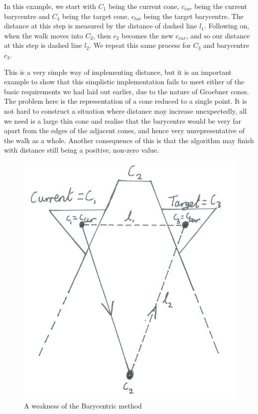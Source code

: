 \documentclass[12pt,a4paper]{report}
\begin{document}
In this example, we start with $C_{1}$ being the current cone, $c_{cur}$ being the current barycentre and $C_{4}$ being the target cone, $c_{tar}$ being the target barycentre. The distance at this step is measured by the distance of dashed line $l_{1}$. Following on, when the walk moves into $C_{2}$, then $c_{2}$ becomes the new $c_{cur}$, and so our distance at this step is dashed line $l_{2}$. We repeat this same process for $C_{3}$ and barycentre $c_{3}$.


This is a very simple way of implementing distance, but it is an important example to show that this simplistic implementation fails to meet either of the basic requirements we had laid out earlier, due to the nature of Groebner cones. The problem here is the representation of a cone reduced to a single point. It is not hard to construct a situation where distance may increase unexpectedly, all we need is a large thin cone and realise that the barycentre would be very far apart from the edges of the adjacent cones, and hence very unrepresentative of the walk as a whole. Another consequence of this is that the algorithm may finish with distance still being a positive, non-zero value.

\begin{figure}
\includegraphics[scale=0.5]{Chapters/images/Barycentre2.png}
\caption{A weakness of the Barycentric method}
\end{figure}
\end{document}
